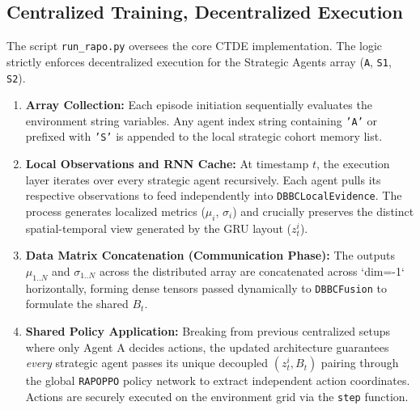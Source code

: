 \documentclass[11pt]{article}
\begin{document}
\subsection{Centralized Training, Decentralized Execution}
The script \texttt{run\_rapo.py} oversees the core CTDE implementation. The logic strictly enforces decentralized execution for the Strategic Agents array (\texttt{A}, \texttt{S1}, \texttt{S2}).

\begin{enumerate}
    \item \textbf{Array Collection:} Each episode initiation sequentially evaluates the environment string variables. Any agent index string containing \texttt{'A'} or prefixed with \texttt{'S'} is appended to the local strategic cohort memory list.
    \item \textbf{Local Observations and RNN Cache:} At timestamp $t$, the execution layer iterates over every strategic agent recursively. Each agent pulls its respective observations to feed independently into \texttt{DBBCLocalEvidence}. The process generates localized metrics ($\mu_i$, $\sigma_i$) and crucially preserves the distinct spatial-temporal view generated by the GRU layout ($z_t^i$).
    \item \textbf{Data Matrix Concatenation (Communication Phase):} The outputs $\mu_{1..N}$ and $\sigma_{1..N}$ across the distributed array are concatenated across `dim=-1` horizontally, forming dense tensors passed dynamically to \texttt{DBBCFusion} to formulate the shared $B_{t}$.
    \item \textbf{Shared Policy Application:} Breaking from previous centralized setups where only Agent A decides actions, the updated architecture guarantees \textit{every} strategic agent passes its unique decoupled $(z_t^i, B_{t})$ pairing through the global \texttt{RAPOPPO} policy network to extract independent action coordinates. Actions are securely executed on the environment grid via the \texttt{step} function. 
\end{enumerate}
\end{document}
